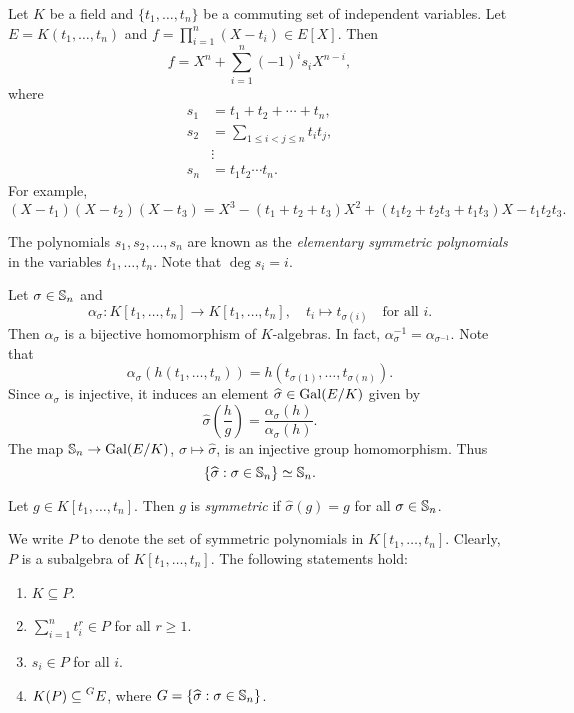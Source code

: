 Let $K$ be a field and $\{t_1,\dots,t_n\}$ be a commuting set of  independent variables.  
Let $E=K(t_1,\dots,t_n)$ and $f=\prod_{i=1}^n(X-t_i)\in E[X]$. 
Then
\[
f=X^n+\sum_{i=1}^n (-1)^i s_i X^{n-i},
\]
where 
\begin{align*}
    s_1 &= t_1+t_2+\cdots+t_n,\\
    s_2 &= \sum_{1\leq i<j\leq n}t_it_j,\\
    &\vdots\\
    s_n &= t_1t_2\cdots t_n.
\end{align*}
For example, 
\[
(X-t_1)(X-t_2)(X-t_3)=X^3-(t_1+t_2+t_3)X^2+(t_1t_2+t_2t_3+t_1t_3)X-t_1t_2t_3.
\]

The polynomials $s_1,s_2,\dots,s_n$ are known as the 
\emph{elementary symmetric polynomials} in the variables $t_1,\dots,t_n$. Note
that $\deg s_i=i$. 

Let $\sigma\in\mathbb{S}_n$ and 
\[
\alpha_{\sigma}\colon K[t_1,\dots,t_n]\to K[t_1,\dots,t_n],
\quad
t_i\mapsto t_{\sigma(i)}\quad\text{for all $i$}.
\]
Then $\alpha_{\sigma}$ is a bijective homomorphism of $K$-algebras. In fact, 
$\alpha_{\sigma}^{-1}=\alpha_{\sigma^{-1}}$. Note that
\[
\alpha_{\sigma}(h(t_1,\dots,t_n))=h(t_{\sigma(1)},\dots,t_{\sigma(n)}).
\]
Since $\alpha_{\sigma}$ is injective, 
it induces an element $\widehat{\sigma}\in\operatorname{Gal}(E/K)$ given by
\[
    \widehat{\sigma}\left(\frac{h}{g}\right)
    =\frac{\alpha_{\sigma}(h)}{\alpha_{\sigma}(h)}.
\]
The map $\mathbb{S}_n\to\operatorname{Gal}(E/K)$, $\sigma\mapsto\widehat{\sigma}$, 
is an injective group homomorphism. Thus
\[
\{\widehat{\sigma}:\sigma\in\mathbb{S}_n\}\simeq\mathbb{S}_n.
\]

\begin{definition}
    Let $g\in K[t_1,\dots,t_n]$. Then $g$ is \emph{symmetric} 
    if $\widehat{\sigma}(g)=g$ for all $\sigma\in\mathbb{S}_n$. 
\end{definition}
    
We write $P$ to denote the set of symmetric polynomials in $K[t_1,\dots,t_n]$. 
Clearly,
$P$ is a subalgebra of $K[t_1,\dots,t_n]$. The following statements hold:
\begin{enumerate}
    \item $K\subseteq P$.
    \item $\sum_{i=1}^n t_i^r\in P$ for all $r\geq1$.
    \item $s_i\in P$ for all $i$.
    \item $K(P)\subseteq\prescript{G}{}{E}$, where $G=\{\widehat{\sigma}:\sigma\in\mathbb{S}_n\}$.  
\end{enumerate}

